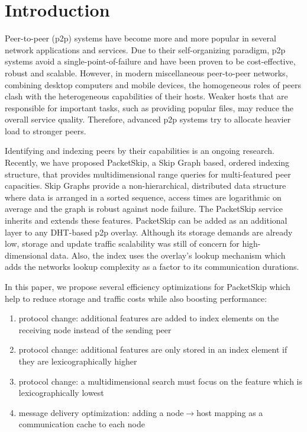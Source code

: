 \section{Introduction}
\label{sec:introduction}

Peer-to-peer (p2p) systems have become more and more popular in several network applications and services. Due to their self-organizing paradigm, p2p systems avoid a single-point-of-failure and have been proven to be cost-effective, robust and scalable. However, in modern miscellaneous peer-to-peer networks, combining desktop computers and mobile devices, the homogeneous roles of peers clash with the heterogeneous capabilities of their hosts. Weaker hosts that are responsible for important tasks, such as providing popular files, may reduce the overall service quality. Therefore, advanced p2p systems try to allocate heavier load to stronger peers.

Identifying and indexing peers by their capabilities is an ongoing research. Recently, we have proposed PacketSkip, a Skip Graph based, ordered indexing structure, that provides multidimensional range queries for multi-featured peer capacities. Skip Graphs provide a non-hierarchical, distributed data structure where data is arranged in a sorted sequence, access times are logarithmic on average and the graph is robust against node failure. The PacketSkip service inherits and extends these features. PacketSkip can be added as an additional layer to any DHT-based p2p overlay. Although its storage demands are already low, storage and update traffic scalability was still of concern for high-dimensional data. Also, the index uses the overlay's lookup mechanism which adds the networks lookup complexity as a factor to its communication durations.

In this paper, we propose several efficiency optimizations for PacketSkip which help to reduce storage and traffic costs while also boosting performance:

\begin{enumerate}
  \item protocol change: additional features are added to index elements on the receiving node instead of the sending peer
  \item protocol change: additional features are only stored in an index element if they are lexicographically higher
  \item protocol change: a multidimensional search must focus on the feature which is lexicographically lowest
  \item message delivery optimization: adding a node$\rightarrow$host mapping as a communication cache to each node
\end{enumerate}

